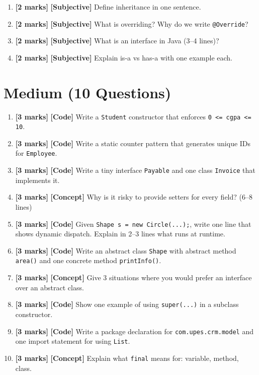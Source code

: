\documentclass[11pt,a4paper]{article}
\newcommand{\EMarks}{\textbf{[2 marks]} }
\newcommand{\MMarks}{\textbf{[3 marks]} }
\begin{document}
\begin{enumerate}[label=\textbf{E\arabic*.}, leftmargin=*]
  \item \EMarks \textbf{[Subjective]} Define inheritance in one sentence.

  \item \EMarks \textbf{[Subjective]} What is overriding? Why do we write \texttt{@Override}?

  \item \EMarks \textbf{[Subjective]} What is an interface in Java (3--4 lines)?

  \item \EMarks \textbf{[Subjective]} Explain is-a vs has-a with one example each.
\end{enumerate}

\section*{Medium (10 Questions)}
\begin{enumerate}[label=\textbf{M\arabic*.}, leftmargin=*]
  \item \MMarks \textbf{[Code]} Write a \texttt{Student} constructor that enforces \texttt{0 <= cgpa <= 10}.

  \item \MMarks \textbf{[Code]} Write a static counter pattern that generates unique IDs for \texttt{Employee}.

  \item \MMarks \textbf{[Code]} Write a tiny interface \texttt{Payable} and one class \texttt{Invoice} that implements it.

  \item \MMarks \textbf{[Concept]} Why is it risky to provide setters for every field? (6--8 lines)

  \item \MMarks \textbf{[Code]} Given \texttt{Shape s = new Circle(...);}, write one line that shows dynamic dispatch.
    Explain in 2--3 lines what runs at runtime.

  \item \MMarks \textbf{[Code]} Write an abstract class \texttt{Shape} with abstract method \texttt{area()} and one concrete method \texttt{printInfo()}.

  \item \MMarks \textbf{[Concept]} Give 3 situations where you would prefer an interface over an abstract class.

  \item \MMarks \textbf{[Code]} Show one example of using \texttt{super(...)} in a subclass constructor.

  \item \MMarks \textbf{[Code]} Write a package declaration for \texttt{com.upes.crm.model} and one import statement for using \texttt{List}.

  \item \MMarks \textbf{[Concept]} Explain what \texttt{final} means for: variable, method, class.
\end{enumerate}
\end{document}
